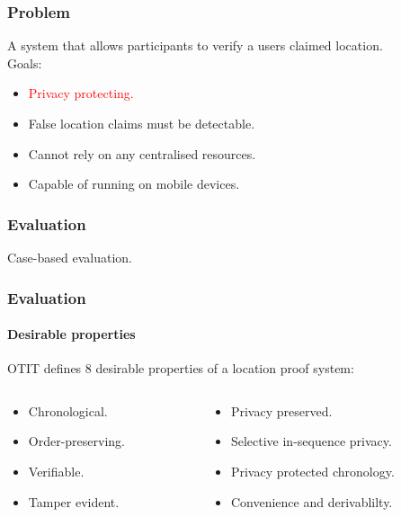 \documentclass{beamer}
\begin{document}
	\begin{frame}[noframenumbering]
    	\frametitle{Problem}
    	A system that allows participants to verify a users claimed location.
    	\\
    	\null
    	Goals:
   		\begin{itemize}
    		\item \textcolor{red}{Privacy protecting.}
    		\item False location claims must be detectable.
    		\item Cannot rely on any centralised resources.
    		\item Capable of running on mobile devices.
    	\end{itemize}
	\end{frame}
	
	\begin{frame}
		\frametitle{Evaluation}
		Case-based evaluation.
		\newline
		
	\end{frame}
	
	\begin{frame}
		\frametitle{Evaluation}
		\framesubtitle{Desirable properties}
		OTIT defines 8 desirable properties of a location proof system:
		\begin{columns}
			\begin{column}{0.5\textwidth}
				\begin{itemize}
					\item Chronological.
					\item Order-preserving.\newline
					\item Verifiable.\newline
					\item Tamper evident.
				\end{itemize}
			\end{column}
			\begin{column}{0.5\textwidth}
				\begin{itemize}
					\item Privacy preserved.
					\item Selective in-sequence privacy.
					\item Privacy protected chronology.
					\item Convenience and derivablilty.
				\end{itemize}
			\end{column}
		\end{columns}
	\end{frame}
	
\end{document}
